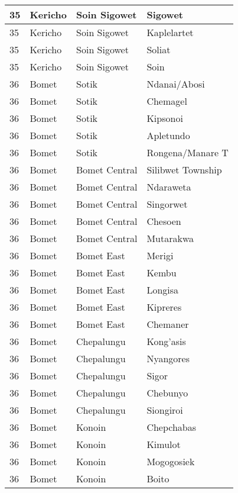 \begin{table}[!ht]
\begin{tabular}{|l|l|l|l|}
        35 & Kericho & Soin Sigowet & Sigowet \\ \hline
        35 & Kericho & Soin Sigowet & Kaplelartet \\ \hline
        35 & Kericho & Soin Sigowet & Soliat \\ \hline
        35 & Kericho & Soin Sigowet & Soin \\ \hline
        36 & Bomet & Sotik & Ndanai/Abosi \\ \hline
        36 & Bomet & Sotik & Chemagel \\ \hline
        36 & Bomet & Sotik & Kipsonoi \\ \hline
        36 & Bomet & Sotik & Apletundo \\ \hline
        36 & Bomet & Sotik & Rongena/Manare T \\ \hline
        36 & Bomet & Bomet Central & Silibwet Township \\ \hline
        36 & Bomet & Bomet Central & Ndaraweta \\ \hline
        36 & Bomet & Bomet Central &  Singorwet \\ \hline
        36 & Bomet & Bomet Central & Chesoen \\ \hline
        36 & Bomet & Bomet Central & Mutarakwa \\ \hline
        36 & Bomet & Bomet East & Merigi \\ \hline
        36 & Bomet & Bomet East & Kembu \\ \hline
        36 & Bomet & Bomet East & Longisa \\ \hline
        36 & Bomet & Bomet East & Kipreres \\ \hline
        36 & Bomet & Bomet East & Chemaner \\ \hline
        36 & Bomet & Chepalungu &   Kong’asis \\ \hline
        36 & Bomet & Chepalungu &  Nyangores \\ \hline
        36 & Bomet & Chepalungu & Sigor \\ \hline
        36 & Bomet & Chepalungu &  Chebunyo \\ \hline
        36 & Bomet & Chepalungu & Siongiroi \\ \hline
        36 & Bomet & Konoin & Chepchabas \\ \hline
        36 & Bomet & Konoin & Kimulot \\ \hline
        36 & Bomet & Konoin & Mogogosiek \\ \hline
        36 & Bomet & Konoin & Boito \\ \hline

\end{tabular}
\end{table}
